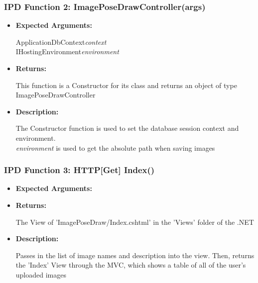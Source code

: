\documentclass{scrreprt}
\begin{document}
\subsubsection{IPD Function 2: ImagePoseDrawController(args)}
\begin{itemize}
    \item \textbf{Expected Arguments:}

    ApplicationDbContext\quad\textit{context}
    \\
    IHostingEnvironment\quad\textit{environment}

    \item \textbf{Returns:}

    This function is a Constructor for its class and returns an object of type ImagePoseDrawController

    \item \textbf{Description:}

    The Constructor function is used to set the database session context and environment.
    \\
    \textit{environment} is used to get the absolute path when saving images
\end{itemize}


\subsubsection{IPD Function 3: HTTP[Get] Index()}
\begin{itemize}
    \item \textbf{Expected Arguments:}

    \item \textbf{Returns:}

    The View of 'ImagePoseDraw/Index.cshtml' in the 'Views' folder of the .NET

    \item \textbf{Description:}

    Passes in the list of image names and description into the view. Then, returns the 'Index' View through the MVC, which shows a table of all of the user's uploaded images
\end{itemize}
\end{document}
